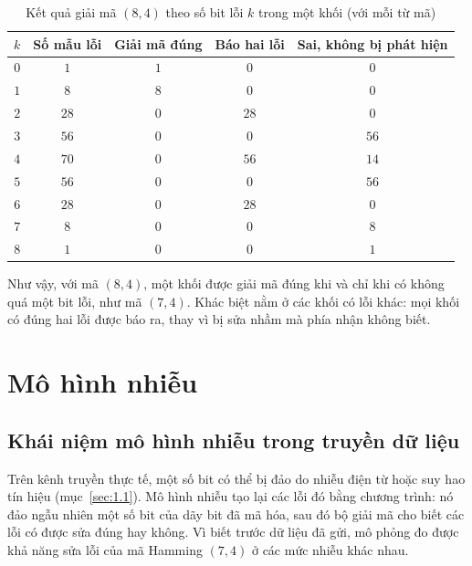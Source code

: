 \begin{table}[H]
\centering\small\renewcommand{\arraystretch}{1.1}
\caption{Kết quả giải mã $(8,4)$ theo số bit lỗi $k$ trong một khối (với mỗi
  từ mã)}
\label{tab:84theok}
\begin{tabular}{|c|c|c|c|c|}
\hline
$k$ & \textbf{Số mẫu lỗi} & \textbf{Giải mã đúng} & \textbf{Báo hai lỗi} &
  \textbf{Sai, không bị phát hiện}\\ \hline
$0$ & $1$  & $1$ & $0$  & $0$\\ \hline
$1$ & $8$  & $8$ & $0$  & $0$\\ \hline
$2$ & $28$ & $0$ & $28$ & $0$\\ \hline
$3$ & $56$ & $0$ & $0$  & $56$\\ \hline
$4$ & $70$ & $0$ & $56$ & $14$\\ \hline
$5$ & $56$ & $0$ & $0$  & $56$\\ \hline
$6$ & $28$ & $0$ & $28$ & $0$\\ \hline
$7$ & $8$  & $0$ & $0$  & $8$\\ \hline
$8$ & $1$  & $0$ & $0$  & $1$\\ \hline
\end{tabular}
\end{table}

Như vậy, với mã $(8,4)$, một khối được giải mã đúng khi và chỉ khi có không quá
một bit lỗi, như mã $(7,4)$. Khác biệt nằm ở các khối có lỗi khác: mọi khối có
đúng hai lỗi được báo ra, thay vì bị sửa nhầm mà phía nhận không biết.

\section{Mô hình nhiễu}
\label{sec:4.4}

\subsection{Khái niệm mô hình nhiễu trong truyền dữ liệu}
\label{ss:4.4.1}

Trên kênh truyền thực tế, một số bit có thể bị đảo do nhiễu điện từ hoặc suy
hao tín hiệu (mục~\ref{sec:1.1}). Mô hình nhiễu tạo lại các lỗi đó bằng chương
trình: nó đảo ngẫu nhiên một số bit của dãy bit đã mã hóa, sau đó bộ giải mã cho
biết các lỗi có được sửa đúng hay không. Vì biết trước dữ liệu đã gửi, mô phỏng
đo được khả năng sửa lỗi của mã Hamming $(7,4)$ ở các mức nhiễu khác nhau.

